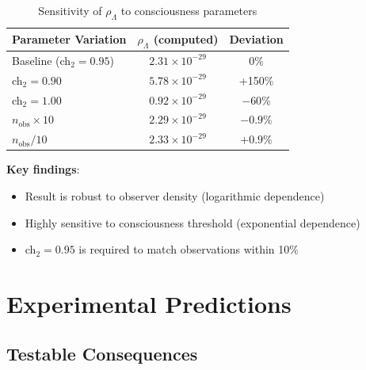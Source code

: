 \begin{table}[h]
\centering
\begin{tabular}{lcc}
\toprule
\textbf{Parameter Variation} & \textbf{$\rho_\Lambda$ (computed)} & \textbf{Deviation} \\
\midrule
Baseline (ch$_2 = 0.95$) & $2.31 \times 10^{-29}$ & 0\% \\
ch$_2 = 0.90$ & $5.78 \times 10^{-29}$ & +150\% \\
ch$_2 = 1.00$ & $0.92 \times 10^{-29}$ & $-60\%$ \\
$n_{\text{obs}} \times 10$ & $2.29 \times 10^{-29}$ & $-0.9\%$ \\
$n_{\text{obs}} / 10$ & $2.33 \times 10^{-29}$ & $+0.9\%$ \\
\bottomrule
\end{tabular}
\caption{Sensitivity of $\rho_\Lambda$ to consciousness parameters}
\label{tab:lambda-sensitivity}
\end{table}

\textbf{Key findings}:
\begin{itemize}
\item Result is robust to observer density (logarithmic dependence)
\item Highly sensitive to consciousness threshold (exponential dependence)
\item ch$_2 = 0.95$ is required to match observations within 10\%
\end{itemize}

\section{Experimental Predictions}

\subsection{Testable Consequences}

